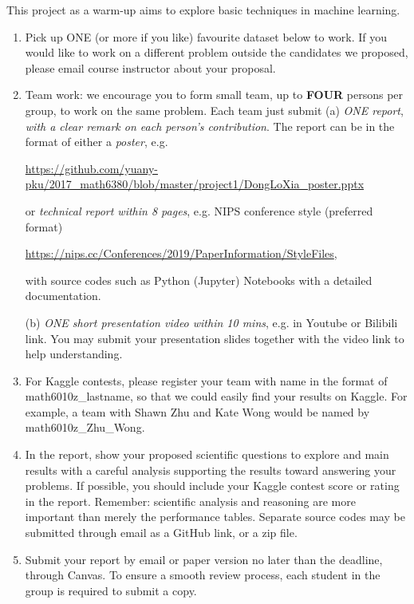 \documentclass[11pt]{article}
\begin{document}
This project as a warm-up aims to explore basic techniques in machine learning.
\begin{enumerate}
\item Pick up ONE (or more if you like) favourite dataset below to work. If you would like to work on a different problem outside the candidates we proposed, please email course instructor about your proposal.  
\item Team work: we encourage you to form small team, up to {\bf FOUR} persons per group, to work on the same problem. Each team just submit 
\subitem(a) \emph{ONE report}, \emph{with a clear remark on each person's contribution}. The report can be in the format of either a \emph{poster}, e.g. 
\begin{center}%
\url{https://github.com/yuany-pku/2017_math6380/blob/master/project1/DongLoXia_poster.pptx}
\end{center}
or \emph{technical report within 8 pages}, e.g. NIPS conference style (preferred format) 
\begin{center}
\url{https://nips.cc/Conferences/2019/PaperInformation/StyleFiles}, 
\end{center}
with source codes such as Python (Jupyter) Notebooks with a detailed documentation.

\subitem(b) \emph{ONE short presentation video within 10 mins}, e.g. in Youtube or Bilibili link. You may submit your presentation slides together with the video link to help understanding. 

\item For Kaggle contests, please register your team with name in the format of math6010z\_lastname, so that we could easily find your results on Kaggle. For example, a team with Shawn Zhu and Kate Wong would be named by math6010z\_Zhu\_Wong.

\item In the report, show your proposed scientific questions to explore and main results with a careful analysis supporting the results toward answering your problems. If possible, you should include your Kaggle contest score or rating in the report. Remember: scientific analysis and reasoning are more important than merely the performance tables. Separate source codes may be submitted through email as a GitHub link, or a zip file.    
\item Submit your report by email or paper version no later than the deadline, through Canvas. To ensure a smooth review process, each student in the group is required to submit a copy.


\end{enumerate}
\end{document}
